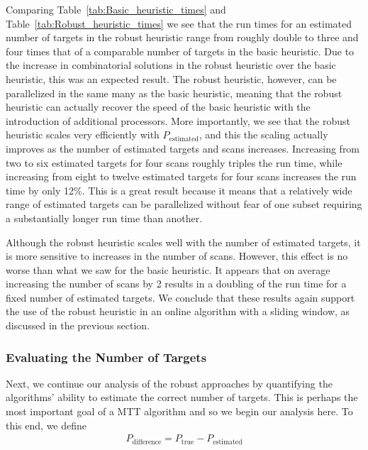 Comparing Table~\ref{tab:Basic_heuristic_times} and Table~\ref{tab:Robust_heuristic_times} we see that the run times for an estimated number of targets in the robust heuristic range from roughly double to three and four times that of a comparable number of targets in the basic heuristic. Due to the increase in combinatorial solutions in the robust heuristic over the basic heuristic, this was an expected result. The robust heuristic, however, can be parallelized in the same many as the basic heuristic, meaning that the robust heuristic can actually recover the speed of the basic heuristic with the introduction of additional processors. More importantly, we see that the robust heuristic scales very efficiently with $P_{\text{estimated}}$, and this the scaling actually improves as the number of estimated targets and scans increases. Increasing from two to six estimated targets for four scans roughly triples the run time, while increasing from eight to twelve estimated targets for four scans increases the run time by only 12\%. This is a great result because it means that a relatively wide range of estimated targets can be parallelized without fear of one subset requiring a substantially longer run time than another. 

Although the robust heuristic scales well with the number of estimated targets, it is more sensitive to increases in the number of scans. However, this effect is no worse than what we saw for the basic heuristic. It appears that on average increasing the number of scans by 2 results in a doubling of the run time for a fixed number of estimated targets. We conclude that these results again support the use of the robust heuristic in an online algorithm with a sliding window, as discussed in the previous section.
 
\subsubsection{Evaluating the Number of Targets}
Next, we continue our analysis of the robust approaches by quantifying the algorithms' ability to estimate the correct number of targets. This is perhaps the most important goal of a MTT algorithm and so we begin our analysis here. To this end, we define
\begin{align}
	P_{\text{difference}} = P_{\text{true}} - P_{\text{estimated}}
\end{align}

